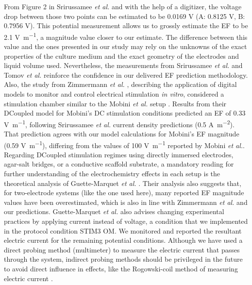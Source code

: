 From Figure 2 in Srirussamee \textit{et al.} \cite{Srirussamee2021-cj} and with the help of a digitizer, the voltage drop between those two points can be estimated to be 0.0169 \si{\volt} (A: 0.8125 \si{\volt}, B: 0.7956 \si{\volt}). This potential measurement allows us to grossly estimate the \acs{EF} to be 2.1 \si{\volt\per\meter}, a magnitude value closer to our estimate. The difference between this value and the ones presented in our study may rely on the unknowns of the exact properties of the culture medium and the exact geometry of the electrodes and liquid volume used. Nevertheless, the measurements from Srirussamee \textit{et al.} \cite{Srirussamee2019-ai} and Tomov \textit{et al.} \cite{Tomov2000-db} reinforce the confidence in our delivered \ac{EF} prediction methodology. Also, the study from Zimmermann \textit{et al.} \cite{Zimmermann2021-fx}, describing the application of digital models to monitor and control electrical stimulation \textit{in vitro}, considered a stimulation chamber similar to the Mobini \textit{et al.} setup \cite{Mobini2016-jh}. Results from their \ac{DCoupled} model for Mobini’s DC stimulation conditions predicted an \ac{EF} of 0.33 \si{\volt\per\meter}, following Srirussamee \textit{et al.} \cite{Srirussamee2021-cj} current density predictions (0.5 \si{\ampere\per\square\meter}). That prediction agrees with our model calculations for Mobini’s \ac{EF} magnitude (0.59 \si{\volt\per\meter}), differing from the values of 100 \si{\volt\per\meter} reported by Mobini \textit{et al.}. Regarding \ac{DCoupled} stimulation regimes using directly immersed electrodes, agar-salt bridges, or a conductive scaffold substrate, a mandatory reading for further understanding of the electrochemistry effects in each setup is the theoretical analysis of Guette-Marquet \textit{et al.} \cite{Guette-Marquet2021-rp}. Their analysis also suggests that, for two-electrode systems (like the one used here), many reported \ac{EF} magnitude values have been overestimated, which is also in line with Zimmermann \textit{et al.} \cite{Zimmermann2021-fx} and our predictions. Guette-Marquet \textit{et al.} also advises changing experimental practices by applying current instead of voltage, a condition that we implemented in the protocol condition STIM3 OM. We monitored and reported the resultant electric current for the remaining potential conditions. Although we have used a direct probing method (multimeter) to measure the electric current that passes through the system, indirect probing methods should be privileged in the future to avoid direct influence in effects, like the Rogowski-coil method of measuring electric current \cite{Ward1993-wl}.


